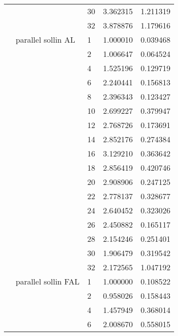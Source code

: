 \begin{tabular}{lllrr}
                      &                     & 30 &  3.362315 &  1.211319 \\
                      &                     & 32 &  3.878876 &  1.179616 \\
                      & parallel sollin AL & 1  &  1.000010 &  0.039468 \\
                      &                     & 2  &  1.006647 &  0.064524 \\
                      &                     & 4  &  1.525196 &  0.129719 \\
                      &                     & 6  &  2.240441 &  0.156813 \\
                      &                     & 8  &  2.396343 &  0.123427 \\
                      &                     & 10 &  2.699227 &  0.379947 \\
                      &                     & 12 &  2.768726 &  0.173691 \\
                      &                     & 14 &  2.852176 &  0.274384 \\
                      &                     & 16 &  3.129210 &  0.363642 \\
                      &                     & 18 &  2.856419 &  0.420746 \\
                      &                     & 20 &  2.908906 &  0.247125 \\
                      &                     & 22 &  2.778137 &  0.328677 \\
                      &                     & 24 &  2.640452 &  0.323026 \\
                      &                     & 26 &  2.450882 &  0.165117 \\
                      &                     & 28 &  2.154246 &  0.251401 \\
                      &                     & 30 &  1.906479 &  0.319542 \\
                      &                     & 32 &  2.172565 &  1.047192 \\
                      & parallel sollin FAL & 1  &  1.000000 &  0.108522 \\
                      &                     & 2  &  0.958026 &  0.158443 \\
                      &                     & 4  &  1.457949 &  0.368014 \\
                      &                     & 6  &  2.008670 &  0.558015 \\

\end{tabular}
